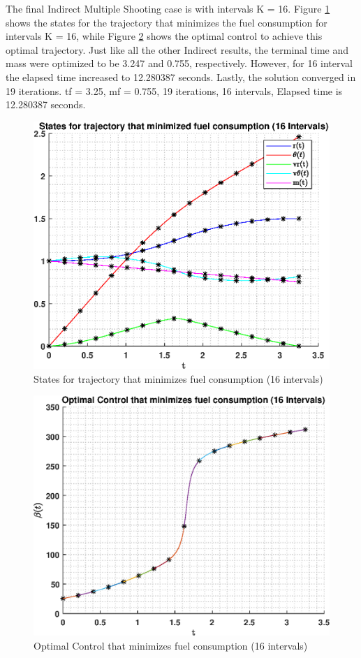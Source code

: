 \documentclass[]{article}
\begin{document}
The final Indirect Multiple Shooting case is with intervals K = 16. Figure \ref{fig:indirectMultiStates16} shows the states for the trajectory that minimizes the fuel consumption for intervals K = 16, while Figure \ref{fig:indirectMultiControl16} shows the optimal control to achieve this optimal trajectory. Just like all the other Indirect results, the terminal time and mass were optimized to be 3.247 and 0.755, respectively. However, for 16 interval the elapsed time increased to 12.280387 seconds. Lastly, the solution converged in 19 iterations.
tf = 3.25, mf = 0.755, 19 iterations, 16 intervals, Elapsed time is 12.280387 seconds.
\begin{figure}
	\centering
	\includegraphics[scale=0.75]{indirectMultiStates16.eps}
	\caption{States for trajectory that minimizes fuel consumption (16 intervals)}
	\label{fig:indirectMultiStates16}
\end{figure}
\begin{figure}
	\centering
	\includegraphics[scale=0.75]{indirectMultiControl16.eps}
	\caption{Optimal Control that minimizes fuel consumption (16 intervals)}
	\label{fig:indirectMultiControl16}
\end{figure}
\FloatBarrier
\end{document}
